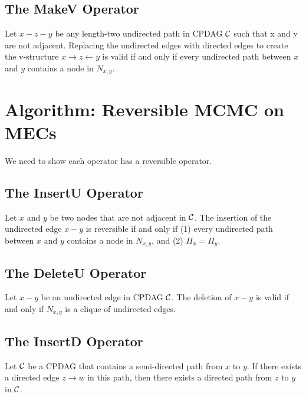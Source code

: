 \subsection{The MakeV Operator}
\begin{theorem}
    Let $x - z - y$ be any length-two undirected path in CPDAG $\mathcal{C}$ such that x and y are not adjacent. Replacing the undirected edges with directed edges to create the v-structure $x \rightarrow z \leftarrow y$ is valid if and only if every undirected path between $x$ and $y$ contains a node in $N_{x,y}$.
\end{theorem}

\section{Algorithm: Reversible MCMC on MECs}

We need to show each operator has a reversible operator.

\subsection{The InsertU Operator}
\begin{theorem}
    Let $x$ and $y$ be two nodes that are not adjacent in $\mathcal{C}$. The insertion of the undirected edge $x - y$ is reversible if and only if (1) every undirected path between $x$ and $y$ contains a node in $N_{x,y}$, and (2) $\Pi_x = \Pi_y$.
\end{theorem}

\subsection{The DeleteU Operator}
\begin{theorem}
    Let $x - y$ be an undirected edge in CPDAG $\mathcal{C}$. The deletion of $x - y$ is valid if and only if $N_{x,y}$ is a clique of undirected edges.
\end{theorem}

\subsection{The InsertD Operator}
\begin{lemma}
    Let $\mathcal{C}$ be a CPDAG that contains a semi-directed path from $x$ to $y$. If there exists a directed edge $z \rightarrow w$ in this path, then there exists a directed path from $z$ to $y$ in $\mathcal{C}$.
\end{lemma}

